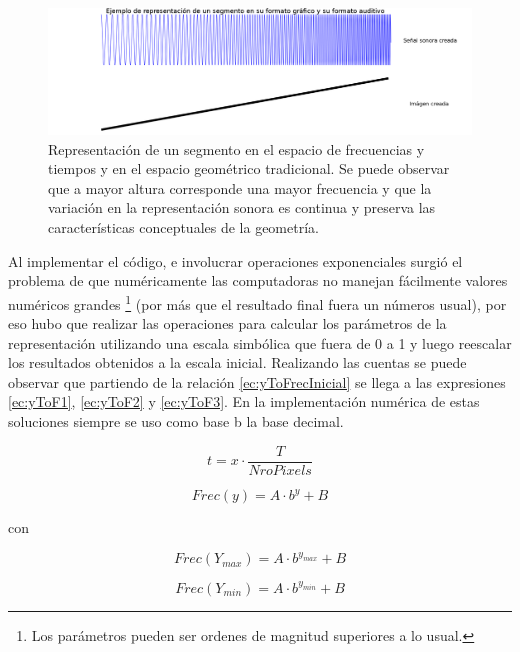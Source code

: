 \documentclass{article}
\numberwithin{figure}{section}
\begin{document}
    \begin{figure}
        \center
        \includegraphics[width=\textwidth]{Imagenes/rampaFrec.png}
        \caption{Representación de un segmento en el espacio de frecuencias y tiempos y en el espacio geométrico tradicional. Se puede observar que a mayor altura corresponde una mayor frecuencia y que la variación en la representación sonora es continua y preserva las características conceptuales de la geometría.}
        \label{fig:rampaFrec}
    \end{figure}
    
    Al implementar el código, e involucrar operaciones exponenciales surgió el problema de que numéricamente las computadoras no manejan fácilmente valores numéricos grandes \footnote{Los parámetros pueden ser ordenes de magnitud superiores a lo usual.} (por más que el resultado final fuera un números usual), por eso hubo que realizar las operaciones para calcular los parámetros de la representación utilizando una escala simbólica que fuera de 0 a 1 y luego reescalar los resultados obtenidos a la escala inicial. Realizando las cuentas se puede observar que partiendo de la relación \ref{ec:yToFrecInicial} se llega a las expresiones  \ref{ec:yToF1}, \ref{ec:yToF2} y \ref{ec:yToF3}. En la implementación numérica de estas soluciones siempre se uso como base b la base decimal.
    
    \begin{equation}
        \label{ec:xTot}
        t = x \cdot \frac{T}{NroPixels}
    \end{equation}
    
    \begin{equation}
        \label{ec:yToFrecInicial}
        Frec(y) = A \cdot b^{y} + B
    \end{equation}
    
    con 
    
    \begin{equation*}
        Frec(Y_{max}) = A \cdot b^{y_{max}} + B
    \end{equation*}
    
    \begin{equation*}
        Frec(Y_{min}) = A \cdot b^{y_{min}} + B
    \end{equation*}
    
\end{document}
